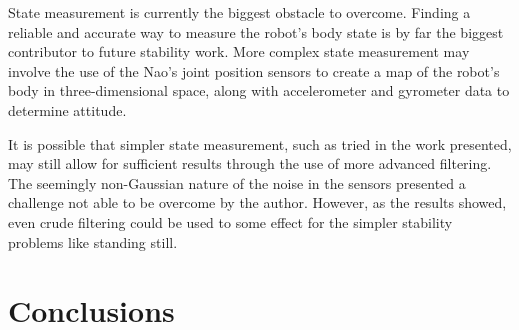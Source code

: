 
State measurement is currently the biggest obstacle to overcome. Finding a reliable and accurate way to measure the robot's body state is by far the biggest contributor to future stability work. More complex state measurement may involve the use of the Nao's joint position sensors to create a map of the robot's body in three-dimensional space, along with accelerometer and gyrometer data to determine attitude.

It is possible that simpler state measurement, such as tried in the work presented, may still allow for sufficient results through the use of more advanced filtering. The seemingly non-Gaussian nature of the noise in the sensors presented a challenge not able to be overcome by the author. However, as the results showed, even crude filtering could be used to some effect for the simpler stability problems like standing still.

\section{Conclusions}
